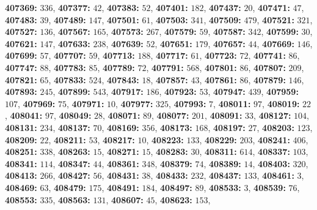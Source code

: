 \textsf{\bfseries 407369:} $336$, \textsf{\bfseries 407377:} $42$, \textsf{\bfseries 407383:} $52$, \textsf{\bfseries 407401:} $182$, \textsf{\bfseries 407437:} $20$, \textsf{\bfseries 407471:} $47$, \textsf{\bfseries 407483:} $39$, \textsf{\bfseries 407489:} $147$, \textsf{\bfseries 407501:} $61$, \textsf{\bfseries 407503:} $341$, \textsf{\bfseries 407509:} $479$, \textsf{\bfseries 407521:} $321$, \textsf{\bfseries 407527:} $136$, \textsf{\bfseries 407567:} $165$, \textsf{\bfseries 407573:} $267$, \textsf{\bfseries 407579:} $59$, \textsf{\bfseries 407587:} $342$, \textsf{\bfseries 407599:} $30$, \textsf{\bfseries 407621:} $147$, \textsf{\bfseries 407633:} $238$, \textsf{\bfseries 407639:} $52$, \textsf{\bfseries 407651:} $179$, \textsf{\bfseries 407657:} $44$, \textsf{\bfseries 407669:} $146$, \textsf{\bfseries 407699:} $57$, \textsf{\bfseries 407707:} $59$, \textsf{\bfseries 407713:} $188$, \textsf{\bfseries 407717:} $61$, \textsf{\bfseries 407723:} $72$, \textsf{\bfseries 407741:} $86$, \textsf{\bfseries 407747:} $88$, \textsf{\bfseries 407783:} $85$, \textsf{\bfseries 407789:} $72$, \textsf{\bfseries 407791:} $568$, \textsf{\bfseries 407801:} $86$, \textsf{\bfseries 407807:} $209$, \textsf{\bfseries 407821:} $65$, \textsf{\bfseries 407833:} $524$, \textsf{\bfseries 407843:} $18$, \textsf{\bfseries 407857:} $43$, \textsf{\bfseries 407861:} $86$, \textsf{\bfseries 407879:} $146$, \textsf{\bfseries 407893:} $245$, \textsf{\bfseries 407899:} $543$, \textsf{\bfseries 407917:} $186$, \textsf{\bfseries 407923:} $53$, \textsf{\bfseries 407947:} $439$, \textsf{\bfseries 407959:} $107$, \textsf{\bfseries 407969:} $75$, \textsf{\bfseries 407971:} $10$, \textsf{\bfseries 407977:} $325$, \textsf{\bfseries 407993:} $7$, \textsf{\bfseries 408011:} $97$, \textsf{\bfseries 408019:} $22$, \textsf{\bfseries 408041:} $97$, \textsf{\bfseries 408049:} $28$, \textsf{\bfseries 408071:} $89$, \textsf{\bfseries 408077:} $201$, \textsf{\bfseries 408091:} $33$, \textsf{\bfseries 408127:} $104$, \textsf{\bfseries 408131:} $234$, \textsf{\bfseries 408137:} $70$, \textsf{\bfseries 408169:} $356$, \textsf{\bfseries 408173:} $168$, \textsf{\bfseries 408197:} $27$, \textsf{\bfseries 408203:} $123$, \textsf{\bfseries 408209:} $22$, \textsf{\bfseries 408211:} $53$, \textsf{\bfseries 408217:} $10$, \textsf{\bfseries 408223:} $133$, \textsf{\bfseries 408229:} $203$, \textsf{\bfseries 408241:} $406$, \textsf{\bfseries 408251:} $338$, \textsf{\bfseries 408263:} $15$, \textsf{\bfseries 408271:} $15$, \textsf{\bfseries 408283:} $30$, \textsf{\bfseries 408311:} $614$, \textsf{\bfseries 408337:} $103$, \textsf{\bfseries 408341:} $114$, \textsf{\bfseries 408347:} $44$, \textsf{\bfseries 408361:} $348$, \textsf{\bfseries 408379:} $74$, \textsf{\bfseries 408389:} $14$, \textsf{\bfseries 408403:} $320$, \textsf{\bfseries 408413:} $266$, \textsf{\bfseries 408427:} $56$, \textsf{\bfseries 408431:} $38$, \textsf{\bfseries 408433:} $232$, \textsf{\bfseries 408437:} $133$, \textsf{\bfseries 408461:} $3$, \textsf{\bfseries 408469:} $63$, \textsf{\bfseries 408479:} $175$, \textsf{\bfseries 408491:} $184$, \textsf{\bfseries 408497:} $89$, \textsf{\bfseries 408533:} $3$, \textsf{\bfseries 408539:} $76$, \textsf{\bfseries 408553:} $335$, \textsf{\bfseries 408563:} $131$, \textsf{\bfseries 408607:} $45$, \textsf{\bfseries 408623:} $153$, 
